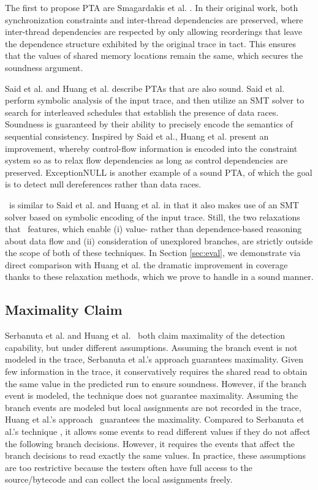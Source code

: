 The first to propose PTA are Smagardakis et al. \cite{yannis}. In their original work, both synchronization constraints and inter-thread dependencies are preserved, where inter-thread dependencies are respected by only allowing reorderings that leave the dependence structure exhibited by the original trace in tact. This ensures that the values of shared memory locations remain the same, which secures the soundness argument.

Said et al. \cite{Said:2011} and Huang et al. \cite{HuangMR14} describe PTAs that are also sound. Said et al. perform symbolic analysis of the input trace, and then utilize an SMT solver to search for interleaved schedules that establish the presence of data races. Soundness is guaranteed by their ability to precisely encode the semantics of sequential consistency. 
Inspired by Said et al., Huang et al. present an improvement, whereby control-flow information is encoded into the constraint system so as to relax flow dependencies as long as control dependencies are preserved.
ExceptionNULL \cite{Farzan:2012} is another example of a sound PTA, of which the goal is to detect null dereferences rather than data races. 

\tool\ is similar to Said et al. and Huang et al. in that it also makes use of an SMT solver based on symbolic encoding of the input trace. Still, the two relaxations that \tool\ features, which enable (i) value- rather than dependence-based reasoning about data flow and (ii) consideration of unexplored branches, are strictly outside the scope of both of these techniques. In Section \ref{sec:eval}, we demonstrate via direct comparison with Huang et al. the dramatic improvement in coverage thanks to these relaxation methods, which we prove to handle in a sound manner.

\subsection{Maximality Claim}
Serbanuta et al. \cite{maximal} and Huang et al.~\cite{HuangMR14} both claim maximality of the detection capability, but under different assumptions. 
Assuming the branch event is not modeled in the trace, Serbanuta et al.'s approach \cite{maximal} guarantees maximality. Given few information in the trace, it conservatively requires the shared read to obtain the same value in the predicted run to ensure soundness. However, if the branch event is modeled, the technique does not guarantee maximality.   
Assuming the branch events are modeled but local assignments are not recorded in the trace, Huang et al.'s approach~\cite{HuangMR14} guarantees the maximality. Compared to Serbanuta et al.'s technique \cite{maximal}, it allows some events to read different values if they do not affect the following branch decisions. However, it requires the events that affect the branch decisions to read exactly the same values. In practice, these assumptions are too restrictive  because the testers often have full access to the source/bytecode and can collect the local assignments freely.  

